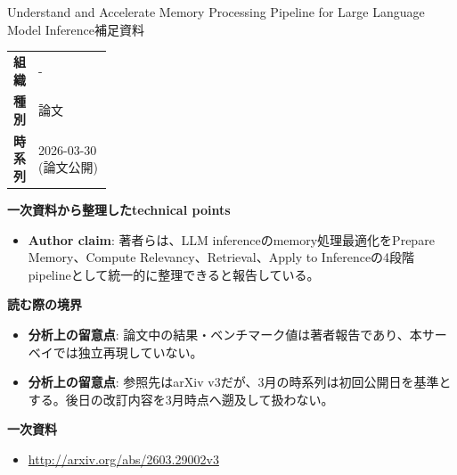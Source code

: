 \begin{technicalnote}{Understand and Accelerate Memory Processing Pipeline for Large Language Model Inference}{補足資料}
\begingroup
\begin{tabularx}{\linewidth}{@{}>{\bfseries}p{0.22\linewidth}X@{}}
組織 & - \\
種別 & 論文 \\
時系列 & 2026-03-30 (論文公開) \\
\end{tabularx}
\smallskip
{\bfseries 一次資料から整理したtechnical points}
\begin{itemize}[leftmargin=1.5em,itemsep=0.35em]
\item \textbf{Author claim}: 著者らは、LLM inferenceのmemory処理最適化をPrepare Memory、Compute Relevancy、Retrieval、Apply to Inferenceの4段階pipelineとして統一的に整理できると報告している。
\end{itemize}
\begin{minipage}{\linewidth}
{\bfseries 読む際の境界}
\begin{itemize}[leftmargin=1.5em,itemsep=0.35em]
\item \textbf{分析上の留意点}: 論文中の結果・ベンチマーク値は著者報告であり、本サーベイでは独立再現していない。
\item \textbf{分析上の留意点}: 参照先はarXiv v3だが、3月の時系列は初回公開日を基準とする。後日の改訂内容を3月時点へ遡及して扱わない。
\end{itemize}
\begin{samepage}
{\bfseries 一次資料}
\begingroup\sloppy
\begin{itemize}[leftmargin=1.5em,itemsep=0.25em]
\item {\scriptsize\url{http://arxiv.org/abs/2603.29002v3}}
\end{itemize}
\endgroup
\end{samepage}
\end{minipage}
\endgroup
\end{technicalnote}
\medskip
